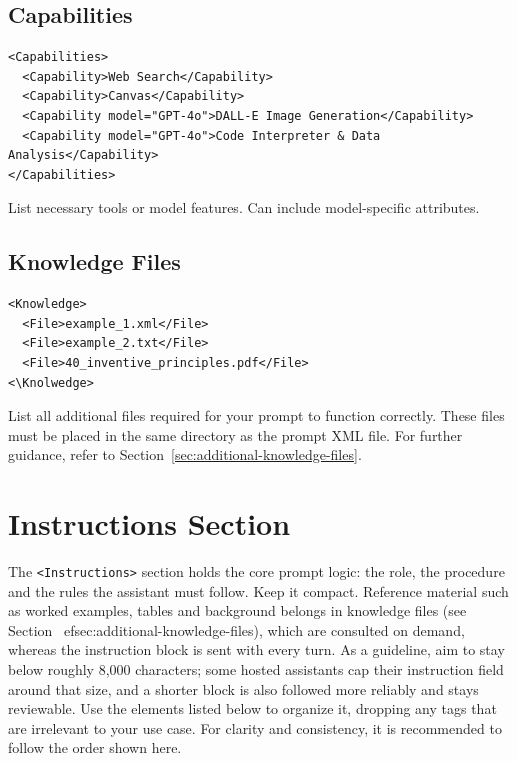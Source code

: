 \documentclass[a4paper,11pt]{refart}
\begin{document}
\subsection{Capabilities}
\begin{lstlisting}
<Capabilities>
  <Capability>Web Search</Capability>
  <Capability>Canvas</Capability>
  <Capability model="GPT-4o">DALL-E Image Generation</Capability>
  <Capability model="GPT-4o">Code Interpreter & Data Analysis</Capability>
</Capabilities>
\end{lstlisting}
List necessary tools or model features. Can include model-specific attributes.

\subsection{Knowledge Files}
\begin{lstlisting}
<Knowledge>
  <File>example_1.xml</File>
  <File>example_2.txt</File>
  <File>40_inventive_principles.pdf</File>
<\Knolwedge>
\end{lstlisting}
List all additional files required for your prompt to function correctly. These files must be placed in the same directory as the prompt XML file. For further guidance, refer to Section~\ref{sec:additional-knowledge-files}.

\section{Instructions Section}
The \lstinline!<Instructions>! section holds the core prompt logic: the role, the procedure and the rules the assistant must follow. Keep it compact. Reference material such as worked examples, tables and background belongs in knowledge files (see Section~
ef{sec:additional-knowledge-files}), which are consulted on demand, whereas the instruction block is sent with every turn. As a guideline, aim to stay below roughly 8,000 characters; some hosted assistants cap their instruction field around that size, and a shorter block is also followed more reliably and stays reviewable. Use the elements listed below to organize it, dropping any tags that are irrelevant to your use case. For clarity and consistency, it is recommended to follow the order shown here.
\end{document}
